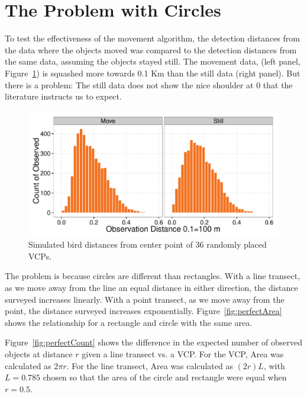 \documentclass[12pt]{article}
\begin{document}


\section{The Problem with Circles}
To test the effectiveness of the movement algorithm, the detection distances from the data where the objects moved was compared to the detection distances from the same data, assuming the objects stayed still. The movement data, (left panel, Figure~\ref{fig:moveTest}) is squashed more towards 0.1 Km than the still data (right panel). But there is a problem: The still data does not show the nice shoulder at 0 that the literature instructs us to expect.

\begin{figure}[h]
	\center
	\includegraphics[width=\textwidth]{../images/movementTest.pdf}
	\caption{Simulated bird distances from center point of 36 randomly placed VCPs.\label{fig:moveTest}}
\end{figure}

The problem is because circles are different than rectangles. With a line transect, as we move away from the line an equal distance in either direction, the distance surveyed increases linearly. With a point transect, as we move away from the point, the distance surveyed increases exponentially. Figure~\ref{fig:perfectArea} shows the relationship for a rectangle and circle with the same area. 

Figure~\ref{fig:perfectCount} shows the difference in the expected number of observed objects at distance $r$ given a line transect vs. a VCP. For the VCP, Area was calculated as $2\pi r$. For the line transect, Area was calculated as $(2r)L$, with $L=0.785$ chosen so that the area of the circle and rectangle were equal when $r=0.5$.
\end{document}

